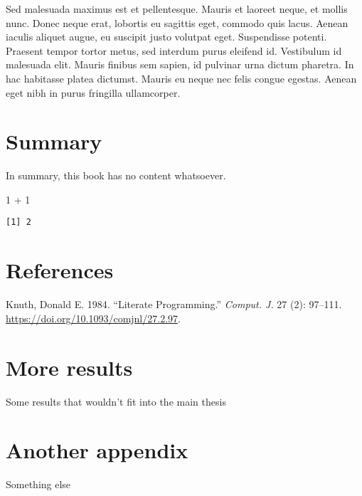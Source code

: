 \documentclass[
  12pt,
  letterpaper,
  oneside,
  open=any]{scrbook}
\newenvironment{Shaded}{\begin{snugshade}}{\end{snugshade}}
\newcommand{\DecValTok}[1]{\textcolor[rgb]{0.68,0.00,0.00}{#1}}
\newcommand{\SpecialCharTok}[1]{\textcolor[rgb]{0.37,0.37,0.37}{#1}}
\newlength{\cslhangindent}
\newlength{\cslentryspacingunit} %
\newenvironment{CSLReferences}[2] %
 {%
  \setlength{\parindent}{0pt}
  \ifodd #1
  \let\oldpar\par
  \def\par{\hangindent=\cslhangindent\oldpar}
  \fi
  \setlength{\parskip}{#2\cslentryspacingunit}
 }%
 {}
\begin{document}
Sed malesuada maximus est et pellentesque. Mauris et laoreet neque, et
mollis nunc. Donec neque erat, lobortis eu sagittis eget, commodo quis
lacus. Aenean iaculis aliquet augue, eu suscipit justo volutpat eget.
Suspendisse potenti. Praesent tempor tortor metus, sed interdum purus
eleifend id. Vestibulum id malesuada elit. Mauris finibus sem sapien, id
pulvinar urna dictum pharetra. In hac habitasse platea dictumst. Mauris
eu neque nec felis congue egestas. Aenean eget nibh in purus fringilla
ullamcorper.


\hypertarget{summary}{%
\chapter{Summary}\label{summary}}

In summary, this book has no content whatsoever.

\begin{Shaded}
\begin{Highlighting}[]
\DecValTok{1} \SpecialCharTok{+} \DecValTok{1}
\end{Highlighting}
\end{Shaded}

\begin{verbatim}
[1] 2
\end{verbatim}


\hypertarget{references}{%
\chapter*{References}\label{references}}


\hypertarget{refs}{}
\begin{CSLReferences}{1}{0}
\leavevmode{}%
Knuth, Donald E. 1984. {``Literate Programming.''} \emph{Comput. J.} 27
(2): 97--111. \url{https://doi.org/10.1093/comjnl/27.2.97}.

\end{CSLReferences}

\cleardoublepage
{}
{}
\appendix

\hypertarget{sec-more-results}{%
\chapter{More results}\label{sec-more-results}}

Some results that wouldn't fit into the main thesis

\hypertarget{another-appendix}{%
\chapter{Another appendix}\label{another-appendix}}

Something else


\backmatter
\end{document}
